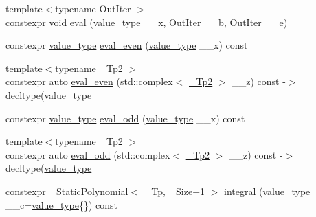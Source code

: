 \begin{DoxyCompactItemize}
\item 
{\footnotesize template$<$typename Out\+Iter $>$ }\\constexpr void \hyperlink{class____gnu__cxx_1_1__StaticPolynomial_abab76d3791fb3575b30f69593da68ca9}{eval} (\hyperlink{class____gnu__cxx_1_1__StaticPolynomial_aad5f3d6d5876b6926b30724aeac649d6}{value\+\_\+type} \+\_\+\+\_\+x, Out\+Iter \+\_\+\+\_\+b, Out\+Iter \+\_\+\+\_\+e)
\item 
constexpr \hyperlink{class____gnu__cxx_1_1__StaticPolynomial_aad5f3d6d5876b6926b30724aeac649d6}{value\+\_\+type} \hyperlink{class____gnu__cxx_1_1__StaticPolynomial_aac0b30914533c2e8f2dfd54568632387}{eval\+\_\+even} (\hyperlink{class____gnu__cxx_1_1__StaticPolynomial_aad5f3d6d5876b6926b30724aeac649d6}{value\+\_\+type} \+\_\+\+\_\+x) const
\item 
{\footnotesize template$<$typename \+\_\+\+Tp2 $>$ }\\constexpr auto \hyperlink{class____gnu__cxx_1_1__StaticPolynomial_a2afdbee7c52c81ad10d8c6657352ec13}{eval\+\_\+even} (std\+::complex$<$ \hyperlink{class____gnu__cxx_1_1__StaticPolynomial_a688f26b7c706701416fad299240aa856}{\+\_\+\+Tp2} $>$ \+\_\+\+\_\+z) const -\/$>$ decltype(\hyperlink{class____gnu__cxx_1_1__StaticPolynomial_aad5f3d6d5876b6926b30724aeac649d6}{value\+\_\+type}
\item 
constexpr \hyperlink{class____gnu__cxx_1_1__StaticPolynomial_aad5f3d6d5876b6926b30724aeac649d6}{value\+\_\+type} \hyperlink{class____gnu__cxx_1_1__StaticPolynomial_a2412b3220116a5721b770a8eef3b5dd8}{eval\+\_\+odd} (\hyperlink{class____gnu__cxx_1_1__StaticPolynomial_aad5f3d6d5876b6926b30724aeac649d6}{value\+\_\+type} \+\_\+\+\_\+x) const
\item 
{\footnotesize template$<$typename \+\_\+\+Tp2 $>$ }\\constexpr auto \hyperlink{class____gnu__cxx_1_1__StaticPolynomial_a7cc56f1084578939b0b7f796936c6419}{eval\+\_\+odd} (std\+::complex$<$ \hyperlink{class____gnu__cxx_1_1__StaticPolynomial_a688f26b7c706701416fad299240aa856}{\+\_\+\+Tp2} $>$ \+\_\+\+\_\+z) const -\/$>$ decltype(\hyperlink{class____gnu__cxx_1_1__StaticPolynomial_aad5f3d6d5876b6926b30724aeac649d6}{value\+\_\+type}
\item 
constexpr \hyperlink{class____gnu__cxx_1_1__StaticPolynomial}{\+\_\+\+Static\+Polynomial}$<$ \+\_\+\+Tp, \+\_\+\+Size+1 $>$ \hyperlink{class____gnu__cxx_1_1__StaticPolynomial_a223bd4d9106732953bea7af8a2c116d1}{integral} (\hyperlink{class____gnu__cxx_1_1__StaticPolynomial_aad5f3d6d5876b6926b30724aeac649d6}{value\+\_\+type} \+\_\+\+\_\+c=\hyperlink{class____gnu__cxx_1_1__StaticPolynomial_aad5f3d6d5876b6926b30724aeac649d6}{value\+\_\+type}\{\}) const

\end{DoxyCompactItemize}
